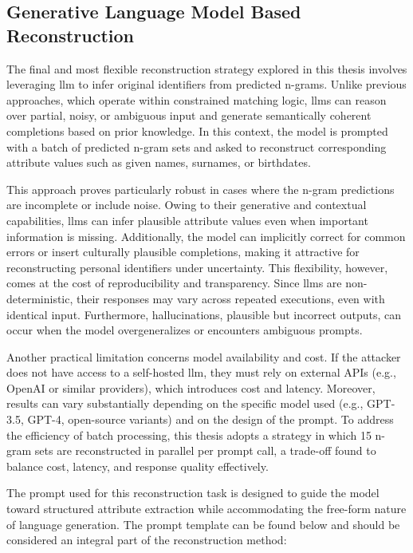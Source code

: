 \subsection{Generative Language Model Based Reconstruction}
\label{sec:generative-llm-reconstruction}

The final and most flexible reconstruction strategy explored in this thesis involves leveraging \ac{llm} to infer original identifiers from predicted n-grams.
Unlike previous approaches, which operate within constrained matching logic, \ac{llm}s can reason over partial, noisy, or ambiguous input and generate semantically coherent completions based on prior knowledge.
In this context, the model is prompted with a batch of predicted n-gram sets and asked to reconstruct corresponding attribute values such as given names, surnames, or birthdates.

This approach proves particularly robust in cases where the n-gram predictions are incomplete or include noise.
Owing to their generative and contextual capabilities, \ac{llm}s can infer plausible attribute values even when important information is missing.
Additionally, the model can implicitly correct for common errors or insert culturally plausible completions, making it attractive for reconstructing personal identifiers under uncertainty.
This flexibility, however, comes at the cost of reproducibility and transparency. Since \ac{llm}s are non-deterministic, their responses may vary across repeated executions, even with identical input.
Furthermore, hallucinations, plausible but incorrect outputs, can occur when the model overgeneralizes or encounters ambiguous prompts.

Another practical limitation concerns model availability and cost.
If the attacker does not have access to a self-hosted \ac{llm}, they must rely on external APIs (e.g., OpenAI or similar providers), which introduces cost and latency.
Moreover, results can vary substantially depending on the specific model used (e.g., GPT-3.5, GPT-4, open-source variants) and on the design of the prompt.
To address the efficiency of batch processing, this thesis adopts a strategy in which 15 n-gram sets are reconstructed in parallel per prompt call, a trade-off found to balance cost, latency, and response quality effectively.

The prompt used for this reconstruction task is designed to guide the model toward structured attribute extraction while accommodating the free-form nature of language generation.
The prompt template can be found below and should be considered an integral part of the reconstruction method:


